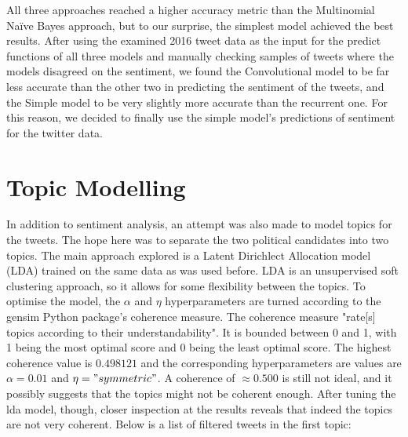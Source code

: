 \documentclass{article}
\begin{document}
  All three approaches reached a higher accuracy metric than the
  Multinomial Naïve Bayes approach, but to our surprise, the simplest
  model achieved the best results. After using the examined 2016 tweet
  data as the input for the predict functions of all three models and
  manually checking samples of tweets where the models disagreed on
  the sentiment, we found the Convolutional model to be far less
  accurate than the other two in predicting the sentiment of the
  tweets, and the Simple model to be very slightly more accurate than
  the recurrent one. For this reason, we decided to finally use the
  simple model’s predictions of sentiment for the twitter data.%
  
  \section{Topic Modelling}

  \indent In addition to sentiment analysis, an attempt was also made
  to model topics for the tweets. The hope here was to separate the two
  political candidates into two topics. The main approach explored is
  a Latent Dirichlect Allocation model (LDA) trained on the same data
  as was used before. LDA is an unsupervised soft clustering approach,
  so it allows for some flexibility between the topics. To optimise the
  model, the $\alpha$ and $\eta$ hyperparameters are turned according
  to the gensim Python package's coherence measure. The coherence
  measure "rate[s] topics according to their understandability". It is 
  bounded between 0 and 1, with 1 being the most optimal score and 0
  being the least optimal score.   The highest coherence value is
  $0.498121$ and the corresponding hyperparameters are values are
  $\alpha = 0.01$ and $\eta = "symmetric"$. A coherence of $\approx
  0.500$ is still not ideal, and it possibly suggests that the topics
  might not be coherent enough. After tuning the lda model, though,
  closer  inspection at the results reveals that indeed the topics are
  not very coherent. Below is a list of filtered tweets in the first topic: 

  
\end{document}
